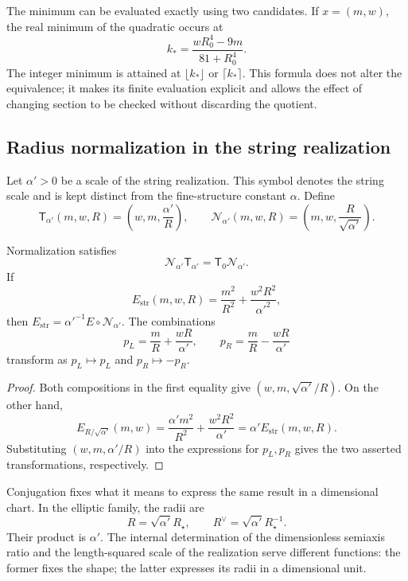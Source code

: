 The minimum can be evaluated exactly using two
candidates. If \(x=(m,w)\), the real minimum of the quadratic
occurs at
\[
 k_* =\frac{wR_0^4-9m}{81+R_0^4}.
\]
The integer minimum is attained at \(\lfloor k_*\rfloor\) or
\(\lceil k_*\rceil\). This formula does not alter the equivalence;
it makes its finite evaluation explicit and allows the effect
of changing section to be checked without discarding the quotient.

\subsection{Radius normalization in the string realization}

Let \(\alpha'>0\) be a scale of the string realization.
This symbol denotes the string scale and is kept distinct
from the fine-structure constant \(\alpha\). Define
\begin{equation}
 \mathsf T_{\alpha'}(m,w,R)
 =\left(w,m,\frac{\alpha'}R\right),\qquad
 \mathcal N_{\alpha'}(m,w,R)
 =\left(m,w,\frac R{\sqrt{\alpha'}}\right).
 \label{x_reciprocidad:iv:eq:normalizacion-cuerda}
\end{equation}

\begin{theorem}
\label{x_reciprocidad:iv:thm:normalizacion-cuerda}
Normalization satisfies
\[
 \mathcal N_{\alpha'}\mathsf T_{\alpha'}
 =\mathsf T_0\mathcal N_{\alpha'}.
\]
If
\[
 E_{\mathrm{str}}(m,w,R)
 =\frac{m^2}{R^2}+\frac{w^2R^2}{\alpha'^2},
\]
then
\(E_{\mathrm{str}}=\alpha'^{-1}E\circ\mathcal N_{\alpha'}\).
The combinations
\[
 p_L=\frac mR+\frac{wR}{\alpha'},\qquad
 p_R=\frac mR-\frac{wR}{\alpha'}
\]
transform as \(p_L\mapsto p_L\) and \(p_R\mapsto-p_R\).
\end{theorem}
\begin{proof}
Both compositions in the first equality give
\((w,m,\sqrt{\alpha'}/R)\). On the other hand,
\[
 E_{R/\sqrt{\alpha'}}(m,w)
 =\frac{\alpha'm^2}{R^2}+\frac{w^2R^2}{\alpha'}
 =\alpha'E_{\mathrm{str}}(m,w,R).
\]
Substituting \((w,m,\alpha'/R)\) into the expressions for
\(p_L,p_R\) gives the two asserted transformations,
respectively.
\end{proof}

Conjugation fixes what it means to express the same result in
a dimensional chart. In the elliptic family, the radii are
\[
 R=\sqrt{\alpha'}R_\star,\qquad
 R^\vee=\sqrt{\alpha'}R_\star^{-1}.
\]
Their product is \(\alpha'\). The internal determination of the
dimensionless semiaxis ratio and the length-squared scale of the
realization serve different functions: the former fixes the shape;
the latter expresses its radii in a dimensional unit.

